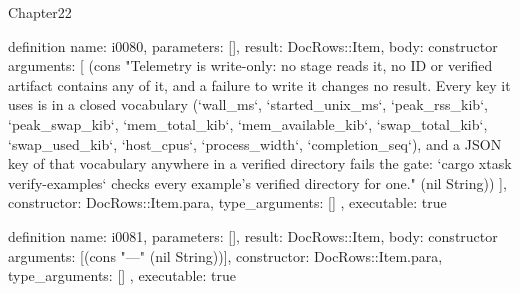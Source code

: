 \begin{lexlean}{Chapter22}
\begin{semanticmodule}
definition{
  name: i0080,
  parameters: [],
  result: DocRows::Item,
  body: constructor{
    arguments: [
      (cons "Telemetry is write-only: no stage reads it, no ID or verified artifact contains any of it, and a failure to write it changes no result. Every key it uses is in a closed vocabulary (`wall_ms`, `started_unix_ms`, `peak_rss_kib`, `peak_swap_kib`, `mem_total_kib`, `mem_available_kib`, `swap_total_kib`, `swap_used_kib`, `host_cpus`, `process_width`, `completion_seq`), and a JSON key of that vocabulary anywhere in a verified directory fails the gate: `cargo xtask verify-examples` checks every example's verified directory for one." (nil String))
    ],
    constructor: DocRows::Item.para,
    type_arguments: []
  },
  executable: true
}

definition{
  name: i0081,
  parameters: [],
  result: DocRows::Item,
  body: constructor{
    arguments: [(cons "---" (nil String))],
    constructor: DocRows::Item.para,
    type_arguments: []
  },
  executable: true
}
\end{semanticmodule}
\end{lexlean}
